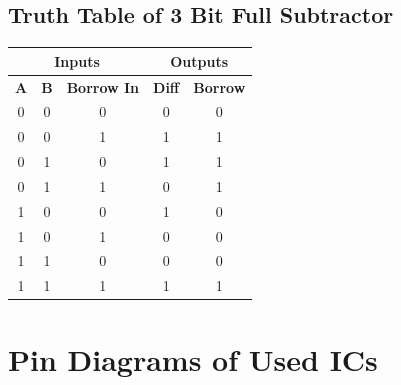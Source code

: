 \documentclass[11pt]{article}
\begin{document}
\subsection{Truth Table of 3 Bit Full Subtractor}
\begin{table}[H]
	\centering
	\begin{tabular}{|ccc|cc|}
		\hline
		\multicolumn{3}{|c|}{\textbf{Inputs}} & \multicolumn{2}{c|}{\textbf{Outputs}}                                                                             \\ \hline
		\multicolumn{1}{|c|}{\textbf{A}}      & \multicolumn{1}{c|}{\textbf{B}}       & \textbf{Borrow In} & \multicolumn{1}{c|}{\textbf{Diff}} & \textbf{Borrow} \\ \hline
		\multicolumn{1}{|c|}{0}               & \multicolumn{1}{c|}{0}                & 0                  & \multicolumn{1}{c|}{0}             & 0               \\ \hline
		\multicolumn{1}{|c|}{0}               & \multicolumn{1}{c|}{0}                & 1                  & \multicolumn{1}{c|}{1}             & 1               \\ \hline
		\multicolumn{1}{|c|}{0}               & \multicolumn{1}{c|}{1}                & 0                  & \multicolumn{1}{c|}{1}             & 1               \\ \hline
		\multicolumn{1}{|c|}{0}               & \multicolumn{1}{c|}{1}                & 1                  & \multicolumn{1}{c|}{0}             & 1               \\ \hline
		\multicolumn{1}{|c|}{1}               & \multicolumn{1}{c|}{0}                & 0                  & \multicolumn{1}{c|}{1}             & 0               \\ \hline
		\multicolumn{1}{|c|}{1}               & \multicolumn{1}{c|}{0}                & 1                  & \multicolumn{1}{c|}{0}             & 0               \\ \hline
		\multicolumn{1}{|c|}{1}               & \multicolumn{1}{c|}{1}                & 0                  & \multicolumn{1}{c|}{0}             & 0               \\ \hline
		\multicolumn{1}{|c|}{1}               & \multicolumn{1}{c|}{1}                & 1                  & \multicolumn{1}{c|}{1}             & 1               \\ \hline
	\end{tabular}
\end{table}

\section{Pin Diagrams of Used ICs}
\end{document}
